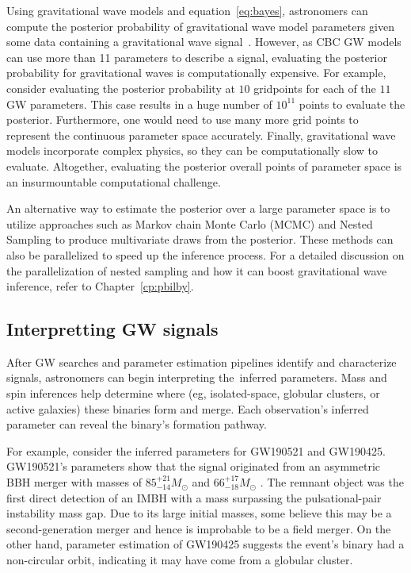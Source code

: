 Using gravitational wave models and equation~\ref{eq:bayes}, astronomers can compute the posterior probability of gravitational wave model parameters given some data containing a gravitational wave signal~\cite{abbott2018prospects}.
However, as CBC GW models can use more than 11 parameters to describe a signal, evaluating the posterior probability for gravitational waves is computationally expensive. 
For example, consider evaluating the posterior probability at $10$ gridpoints for each of the $11$ GW parameters.
This case results in a huge number of $10^11$ points to evaluate the posterior.
Furthermore, one would need to use many more grid points to represent the continuous parameter space accurately.
Finally, gravitational wave models incorporate complex physics, so they can be computationally slow to evaluate. 
Altogether, evaluating the posterior overall points of parameter space is an insurmountable computational challenge.

An alternative way to estimate the posterior over a large parameter space is to utilize approaches such as Markov chain Monte Carlo (MCMC) and Nested Sampling to produce multivariate draws from the posterior. 
These methods can also be parallelized to speed up the inference process. 
For a detailed discussion on the parallelization of nested sampling and how it can boost gravitational wave inference, refer to Chapter~\ref{cp:pbilby}. 


\subsection{Interpretting GW signals}

After GW searches and parameter estimation pipelines  identify and characterize signals, astronomers can begin interpreting the inferred parameters.
Mass and spin inferences help determine where (eg, isolated-space, globular clusters, or active galaxies) these binaries form and merge.
Each observation's inferred parameter can reveal the binary's formation pathway.

For example, consider the inferred parameters for GW190521 and GW190425. 
GW190521's parameters show that the signal originated from an asymmetric BBH merger with masses of $85^{+21}_{-14}M_{\odot}$ and $66^{+17}_{-18}M_{\odot}$ \citep{Abbott:2020tfl}.
The remnant object was the first direct detection of an IMBH with a mass surpassing the pulsational-pair instability mass gap.
Due to its large initial masses, some believe this may be a second-generation merger and hence is improbable to be a field merger. 
On the other hand,  parameter estimation of GW190425 suggests the event's binary had a non-circular orbit, indicating it may have come from a globular cluster.

